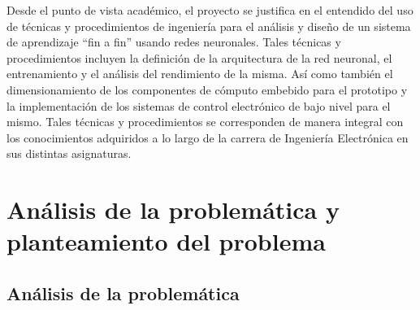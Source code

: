 \documentclass[12pt,letterpaper]{article}
\begin{document}
Desde el punto de vista académico, el proyecto se justifica en el entendido del uso de técnicas y procedimientos 
de ingeniería para el análisis y diseño de un sistema de aprendizaje “fin a fin” usando redes neuronales. Tales 
técnicas y procedimientos incluyen la definición de la arquitectura de la red neuronal, el entrenamiento y el análisis 
del rendimiento de la misma. Así como también el dimensionamiento de los componentes de cómputo embebido para el 
prototipo y la implementación de los sistemas de control electrónico de bajo nivel para el mismo. Tales técnicas y 
procedimientos se corresponden de manera integral con los conocimientos adquiridos a lo largo de la carrera 
de Ingeniería Electrónica en sus distintas asignaturas.



\section{Análisis de la problemática y \\
planteamiento del problema}
\subsection{Análisis de la problemática}
\end{document}
